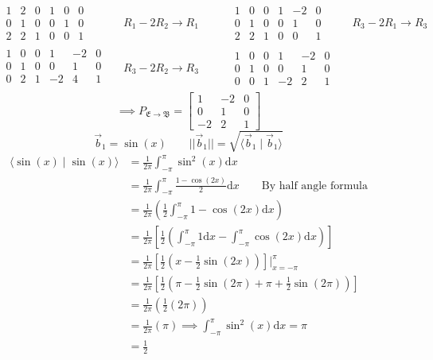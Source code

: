 \documentclass{report}
\begin{document}
$$
\begin{aligned}
&\begin{array}{ccc|ccc}
1&2&0&1&0&0\\
0&1&0&0&1&0\\
2&2&1&0&0&1
\end{array}
&& R_1 - 2R_2 \rightarrow R_1
\qquad
&\begin{array}{ccc|ccc}
1&0&0&1&-2&0\\
0&1&0&0&1&0\\
2&2&1&0&0&1
\end{array}
&& R_3 - 2R_1 \rightarrow R_3\\
&\begin{array}{ccc|ccc}
1&0&0&1&-2&0\\
0&1&0&0&1&0\\
0&2&1&-2&4&1\\
\end{array}
&& R_3 - 2R_2 \rightarrow R_3
&\begin{array}{ccc|ccc}
1&0&0&1&-2&0\\
0&1&0&0&1&0\\
0&0&1&-2&2&1
\end{array}
\end{aligned}
$$
$$
\implies P_{\mathfrak{E}\rightarrow\mathfrak{B}} = \begin{bmatrix}1&-2&0\\0&1&0\\-2&2&1\end{bmatrix}
$$
\pagebreak
{}
\sol
$$
\vec{b}_1 = \sin(x) \qquad ||\vec{b}_1|| = \sqrt{\langle \vec{b}_1 \mid \vec{b}_1 \rangle}
$$
\begin{align}
\langle \sin(x) \mid \sin(x) \rangle &= \frac{1}{2\pi}\int_{-\pi}^{\pi} \sin^2(x)\mathrm{d}x\nonumber\\
&=\frac{1}{2\pi}\int_{-\pi}^{\pi} \frac{1-\cos(2x)}{2}\mathrm{d}x\qquad\text{By half angle formula}\nonumber\\
&=\frac{1}{2\pi}\left(\frac{1}{2}\int_{-\pi}^\pi1-\cos(2x)\mathrm{d}x\right)\nonumber\\
&=\frac{1}{2\pi}\left[\frac{1}{2}\left(\int_{-\pi}^\pi1\mathrm{d}x-\int_{-\pi}^\pi\cos(2x)\mathrm{d}x\right)\right]\nonumber\\
&=\frac{1}{2\pi}\left[\frac{1}{2}\left(x-\frac{1}{2}\sin(2x)\right)\right]\biggr\rvert_{x=-\pi}^\pi\nonumber\\
&=\frac{1}{2\pi}\left[\frac{1}{2}\left(\pi-\frac{1}{2}\sin(2\pi)+\pi+\frac{1}{2}\sin(2\pi)\right)\right]\nonumber\\
&=\frac{1}{2\pi}\left(\frac{1}{2}\left(2\pi\right)\right)\nonumber\\
&=\frac{1}{2\pi}\left(\pi\right)\implies\int_{-\pi}^\pi\sin^2(x)\mathrm{d}x = \pi\\
&=\frac{1}{2}\nonumber
\end{align}
\end{document}
